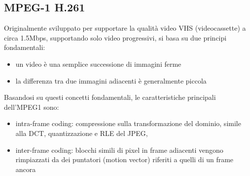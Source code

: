 \documentclass[a4paper,11pt]{article} %
\begin{document}
\subsection{MPEG-1 H.261}
Originalmente sviluppato per supportare la qualità video VHS (videocassette) a circa 1.5Mbps, supportando solo video progressivi, si basa su due principi fondamentali: 
\begin{itemize}
\item un video è una semplice successione di immagini ferme
\item la differenza tra due immagini adiacenti è generalmente piccola
\end{itemize} 
Basandosi su questi concetti fondamentali, le caratteristiche principali dell'MPEG1 sono: 
\begin{itemize}
\item intra-frame coding: compressione sulla transformazione del dominio, simile alla DCT, quantizzazione e RLE del JPEG, 
\item inter-frame coding: blocchi simili di pixel in frame adiacenti vengono rimpiazzati da dei puntatori (motion vector) riferiti a quelli di un frame ancora
\end{itemize}
\end{document}
